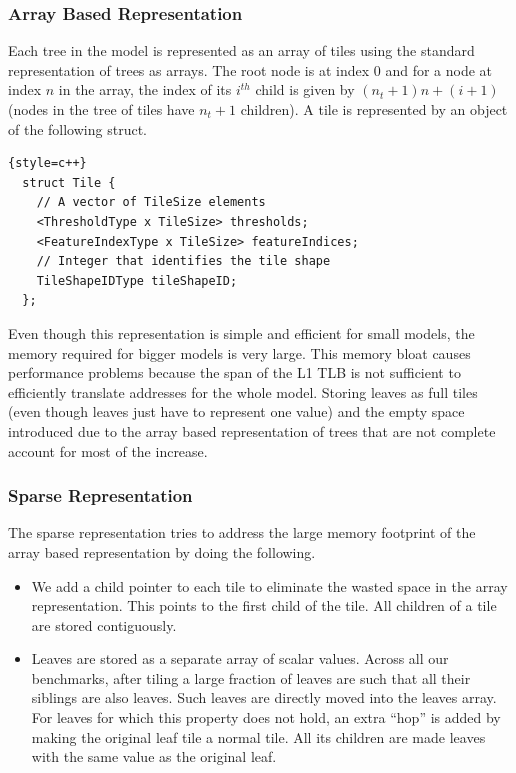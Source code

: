 \subsubsection{Array Based Representation}
\label{sec:ArrayBased}
Each tree in the model is represented as an array of tiles using the standard representation of trees as arrays. The root node is at index 0 and for a node at index $n$ in the array, the index of its $i^{th}$ child is given by $(n_t + 1) n + (i + 1)$ (nodes in the tree of tiles have $n_t + 1$ children). A tile is represented by an object of the following struct.
\begin{lstlisting}{style=c++}
  struct Tile {
    // A vector of TileSize elements
    <ThresholdType x TileSize> thresholds; 
    <FeatureIndexType x TileSize> featureIndices;
    // Integer that identifies the tile shape
    TileShapeIDType tileShapeID; 
  };  
\end{lstlisting}
Even though this representation is simple and efficient for small models, the memory required for bigger models is very large. 
This memory bloat causes performance problems because the span of the L1 TLB is not sufficient to efficiently translate 
addresses for the whole model. Storing leaves as full tiles (even though leaves just have to represent one value) and the
empty space introduced due to the array based representation of trees that are not complete account for most
of the increase.

\subsubsection{Sparse Representation}
\label{sec:SparseRep}
The sparse representation tries to address the large memory footprint of the array based representation by doing the following.

\begin{itemize}
  \item We add a child pointer to each tile to eliminate the wasted space in the array representation. This points to the first child of the tile. All children of a tile are stored contiguously.
  \item Leaves are stored as a separate array of scalar values. Across all our benchmarks, after tiling a large fraction of 
  leaves are such that all their siblings are also leaves. Such leaves are directly moved into the leaves array. For leaves
  for which this property does not hold, an extra ``hop'' is added by making the original leaf tile a normal tile. All its
  children are made leaves with the same value as the original leaf.
\end{itemize}

